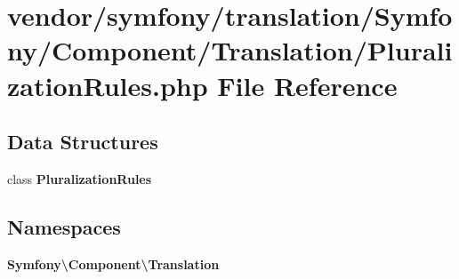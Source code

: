 \section{vendor/symfony/translation/\+Symfony/\+Component/\+Translation/\+Pluralization\+Rules.php File Reference}
\label{_pluralization_rules_8php}
\subsection*{Data Structures}
\begin{DoxyCompactItemize}
\item 
class {\bf Pluralization\+Rules}
\end{DoxyCompactItemize}
\subsection*{Namespaces}
\begin{DoxyCompactItemize}
\item 
 {\bf Symfony\textbackslash{}\+Component\textbackslash{}\+Translation}
\end{DoxyCompactItemize}
